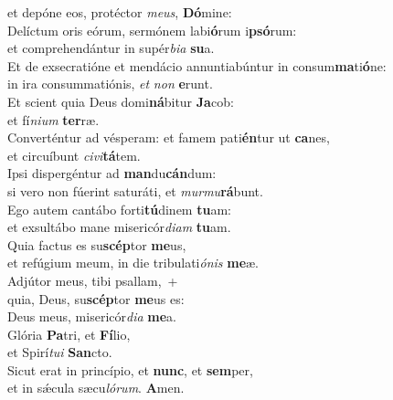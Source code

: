\evenverse et depóne eos, protéctor \textit{me}\textit{us}, \textbf{Dó}mine:\\
\oddverse Delíctum oris eórum, sermónem labi\textbf{ó}rum i\textbf{psó}rum:~\*\\
\oddverse et comprehendántur in supér\textit{bi}\textit{a} \textbf{su}a.\\
\evenverse Et de exsecratióne et mendácio annuntiabúntur in consum\textbf{ma}ti\textbf{ó}ne:~\*\\
\evenverse in ira consummatiónis, \textit{et} \textit{non} \textbf{e}runt.\\
\oddverse Et scient quia Deus domi\textbf{ná}bitur \textbf{Ja}cob:~\*\\
\oddverse et fí\textit{ni}\textit{um} \textbf{ter}ræ.\\
\evenverse Converténtur ad vésperam: et famem pati\textbf{én}tur ut \textbf{ca}nes,~\*\\
\evenverse et circuíbunt \textit{ci}\textit{vi}\textbf{tá}tem.\\
\oddverse Ipsi dispergéntur ad \textbf{man}du\textbf{cán}dum:~\*\\
\oddverse si vero non fúerint saturáti, et \textit{mur}\textit{mu}\textbf{rá}bunt.\\
\evenverse Ego autem cantábo forti\textbf{tú}dinem \textbf{tu}am:~\*\\
\evenverse et exsultábo mane misericór\textit{di}\textit{am} \textbf{tu}am.\\
\oddverse Quia factus es su\textbf{scép}tor \textbf{me}us,~\*\\
\oddverse et refúgium meum, in die tribulati\textit{ó}\textit{nis} \textbf{me}æ.\\
\evenverse Adjútor meus, tibi psallam,~+\\
\evenverse  quia, Deus, su\textbf{scép}tor \textbf{me}us es:~\*\\
\evenverse Deus meus, misericór\textit{di}\textit{a} \textbf{me}a.\\
\oddverse Glória \textbf{Pa}tri, et \textbf{Fí}lio,~\*\\
\oddverse et Spirí\textit{tu}\textit{i} \textbf{San}cto.\\
\evenverse Sicut erat in princípio, et \textbf{nunc}, et \textbf{sem}per,~\*\\
\evenverse et in sǽcula sæcu\textit{ló}\textit{rum}. \textbf{A}men.\\
